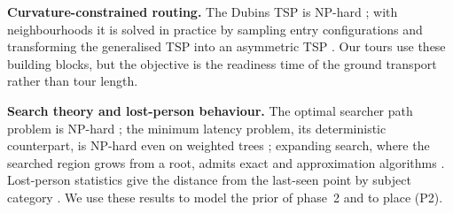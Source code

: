\textbf{Curvature-constrained routing.} The Dubins TSP is NP-hard \cite{leny2012}; with neighbourhoods it is solved in
practice by sampling entry configurations and transforming the generalised TSP into an asymmetric TSP
\cite{isaacs2011,noon1993,obermeyer2009}. Our tours use these building blocks, but the objective is the readiness time
of the ground transport rather than tour length.

\textbf{Search theory and lost-person behaviour.} The optimal searcher path problem is NP-hard
\cite{trummel1986}; the minimum latency problem, its deterministic counterpart, is NP-hard even on weighted trees
\cite{sitters2002}; expanding search, where the searched region grows from a root, admits exact and approximation
algorithms \cite{hermans2019}. Lost-person statistics give the distance from the last-seen point by subject category
\cite{koester2008,koester1998}. We use these results to model the prior of phase~2 and to place (P2).

